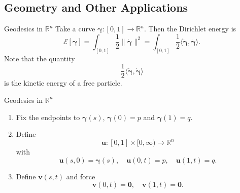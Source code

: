 \documentclass[usenames,dvipsnames]{beamer}
\theoremstyle{definition}
\theoremstyle{theorem}
\newcommand{\R}{\mathbb{R}}
\newcommand{\position}{\boldsymbol{\gamma}}
\newcommand{\velocity}{\boldsymbol{\dot{\gamma}}}
\begin{document}
        
    
    \subsection{Geometry and Other Applications}
    
    \begin{frame}{Geodesics in $\R^n$}
        Take a curve $\boldsymbol{\gamma}\colon [0,1]\to \R^n$.  Then the Dirichlet energy is
        \[
        \mathcal{E}[\boldsymbol{\gamma}] = \int_{[0,1]} \frac{1}{2}\|\boldsymbol{\dot{\gamma}}\|^2 = \int_{[0,1]}\frac{1}{2} \langle \velocity, \velocity \rangle.
        \]
        Note that the quantity
        \[
        \frac{1}{2}\langle \velocity,\velocity \rangle
        \]
        is the kinetic energy of a free particle.
    \end{frame}
    
    \begin{frame}{Geodesics in $\R^n$}
        \begin{enumerate}[1.]
            \item Fix the endpoints to $\position(s)$, $\position(0)=p$ and $\position(1)=q$. 
            \item Define 
            \[
            \mathbf{u} \colon [0,1]\times [0,\infty) \to \R^n
            \]
            with
            \[
            \mathbf{u}(s,0)=\position(s),\quad \mathbf{u}(0,t)=p,\quad \mathbf{u}(1,t)=q.
            \]
            \item Define $\mathbf{v}(s,t)$ and force
            \[
            \mathbf{v}(0,t)=\mathbf{0},\quad \mathbf{v}(1,t)=\mathbf{0}.
            \]
        \end{enumerate}
    \end{frame}
    
\end{document}

